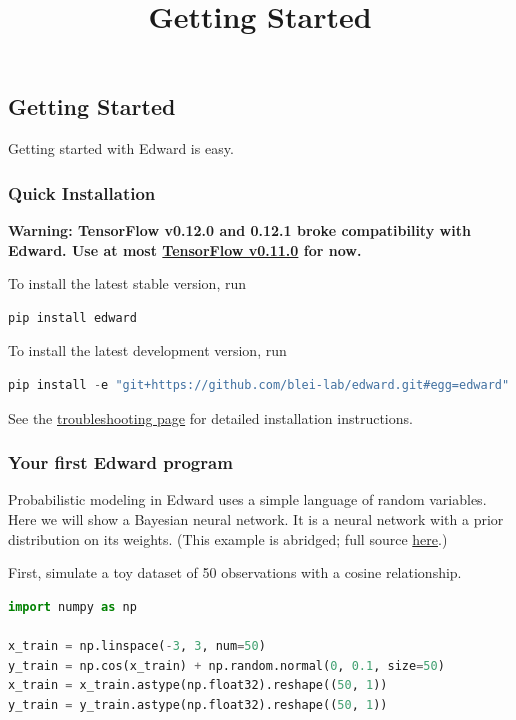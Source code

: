 \title{Getting Started}

\subsection{Getting Started}
Getting started with Edward is easy.

\subsubsection{Quick Installation}
\textbf{Warning: TensorFlow v0.12.0 and 0.12.1 broke
compatibility with Edward. Use at most
\href{https://www.tensorflow.org/versions/r0.11/get_started/os_setup.html#download-and-setup}{TensorFlow v0.11.0} for now.}

To install the latest stable version, run

\begin{lstlisting}[language=Java]
pip install edward
\end{lstlisting}

To install the latest development version, run

\begin{lstlisting}[language=Java]
pip install -e "git+https://github.com/blei-lab/edward.git#egg=edward"
\end{lstlisting}

See the \href{/troubleshooting}{troubleshooting page} for detailed
installation instructions.


\subsubsection{Your first Edward program}

Probabilistic modeling in Edward uses a simple language of
random variables.
Here we will show a Bayesian neural network. It is a neural network
with a prior distribution on its weights.
(This example is abridged; full source
\href{https://github.com/blei-lab/edward/blob/master/examples/getting_started_example.py}
{here}.)

First, simulate a toy dataset of 50 observations with a cosine relationship.

\begin{lstlisting}[language=Python]
import numpy as np

x_train = np.linspace(-3, 3, num=50)
y_train = np.cos(x_train) + np.random.normal(0, 0.1, size=50)
x_train = x_train.astype(np.float32).reshape((50, 1))
y_train = y_train.astype(np.float32).reshape((50, 1))
\end{lstlisting}


